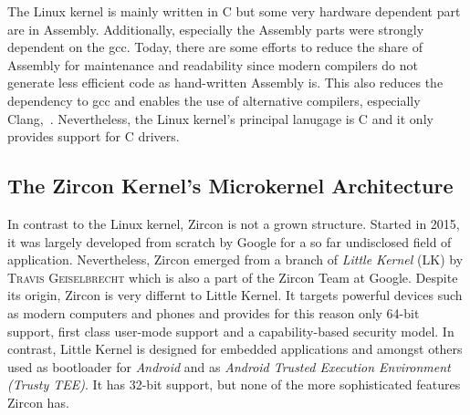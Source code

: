The Linux kernel is mainly written in C but some very hardware dependent part are in Assembly. 
Additionally, especially the Assembly parts were strongly dependent on the \ac{gcc}.
Today, there are some efforts to reduce the share of Assembly for maintenance and readability since modern compilers do not generate less efficient code as hand-written Assembly is\cite{programming-religion}.
This also reduces the dependency to \ac{gcc} and enables the use of alternative compilers, especially Clang\cite{linux-clang},~\cite{fosdem-linux-llvm}.
Nevertheless, the Linux kernel's principal lanugage is C and it only provides support for C drivers. 


\subsection{The Zircon Kernel's Microkernel Architecture}
In contrast to the Linux kernel, Zircon is not a grown structure.
Started in 2015, it was largely developed from scratch by Google for a so far undisclosed field of application\cite{chat-zircon-arch}.
Nevertheless, Zircon emerged from a branch of \textit{Little Kernel} (LK) by \textsc{Travis Geiselbrecht} which is also a part of the Zircon Team at Google\cite{zircon-vs-lk}. 
Despite its origin, Zircon is very differnt to Little Kernel.
It targets powerful devices such as modern computers and phones and provides for this reason only 64-bit support, first class user-mode support and a capability-based security model. 
In contrast, Little Kernel is designed for embedded applications and amongst others used as bootloader for \textit{Android} and as \textit{Android Trusted Execution Environment (Trusty TEE)}\cite{lk-intro}.
It has 32-bit support, but none of the more sophisticated features Zircon has\cite{zircon-vs-lk}.

